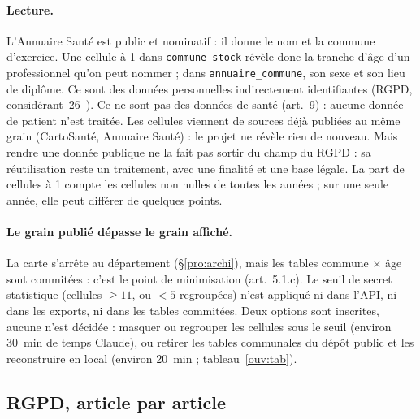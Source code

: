 \paragraph{Lecture.}
L'Annuaire Santé est public et nominatif : il donne le nom et la commune d'exercice.
Une cellule à 1 dans \texttt{commune\_\allowbreak{}stock} révèle donc la tranche d'âge d'un professionnel qu'on peut nommer ; dans \texttt{annuaire\_\allowbreak{}commune}, son sexe et son lieu de diplôme.
Ce sont des données personnelles indirectement identifiantes (RGPD, considérant~26~\citep{e-rgpd}). Ce ne sont pas des données de santé (art.~9) : aucune donnée de patient n'est traitée.
Les cellules viennent de sources déjà publiées au même grain (CartoSanté, Annuaire Santé) : le projet ne révèle rien de nouveau.
Mais rendre une donnée publique ne la fait pas sortir du champ du RGPD : sa réutilisation reste un traitement, avec une finalité et une base légale.
La part de cellules à 1 compte les cellules non nulles de toutes les années ; sur une seule année, elle peut différer de quelques points\suppose{}.

\paragraph{Le grain publié dépasse le grain affiché.}
La carte s'arrête au département (§\ref{pro:archi}), mais les tables commune $\times$ âge sont commitées : c'est le point de minimisation (art.~5.1.c).
Le seuil de secret statistique (cellules $\geq 11$\suppose{}, ou $<5$\suppose{} regroupées) n'est appliqué ni dans l'API, ni dans les exports, ni dans les tables commitées.
Deux options sont inscrites, aucune n'est décidée : masquer ou regrouper les cellules sous le seuil (environ 30\suppose{}~min de temps Claude), ou retirer les tables communales du dépôt public et les reconstruire en local (environ 20\suppose{}~min ; tableau~\ref{ouv:tab}).

\subsection{RGPD, article par article}\label{conf:rgpd}

